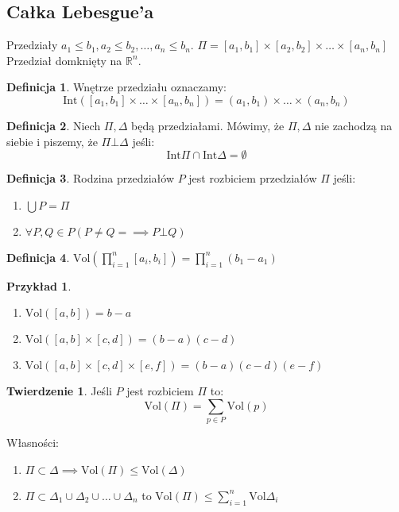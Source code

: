 \documentclass{article}
\theoremstyle{definition}
\newtheorem{de}{Definicja}[subsection]
\theoremstyle{definition}
\newtheorem{tw}{Twierdzenie}[subsection]
\theoremstyle{definition}
\newtheorem{pk}{Przykład}[subsection]
\theoremstyle{definition}
\theoremstyle{definition}
\theoremstyle{definition}
\theoremstyle{definition}
\begin{document}
\subsection{Całka Lebesgue'a}

Przedziały $a_1 \leq b_1, a_2 \leq b_2, \dots, a_n \leq b_n$.
$\Pi = [a_1, b_1] \times [a_2, b_2] \times \dots \times [a_n, b_n]$
Przedział domknięty na $\mathbb{R}^n$. 

\begin{de}
    Wnętrze przedziału oznaczamy:
    \[\text{Int}([a_1,b_1]\times\dots\times[a_n,b_n]) = (a_1,b_1)\times\dots\times(a_n,b_n)\]
\end{de}

\begin{de}
    Niech $\Pi, \Delta$ będą przedziałami. Mówimy, że $\Pi, \Delta$ nie zachodzą na siebie
    i piszemy, że $\Pi \bot \Delta$ jeśli:
        \[\text{Int} \Pi \cap \text{Int} \Delta = \emptyset\]
\end{de}

\begin{de}
    Rodzina przedziałów $P$ jest rozbiciem przedziałów $\Pi$ jeśli:
    \begin{enumerate}
        \item $\bigcup P = \Pi$
        \item $\forall P,Q \in P \left(P\neq Q =\implies P \bot Q \right)$
    \end{enumerate}
\end{de}

\begin{de}
    $\text{Vol}\left(\prod_{i=1}^{n} [a_i,b_i]\right) = \prod_{i=1}^{n} (b_1-a_1)$
\end{de}

\begin{pk}
    \begin{enumerate}
        \item $\text{Vol}([a,b]) = b-a$
        \item $\text{Vol}([a,b]\times[c,d]) = (b-a)(c-d)$
        \item $\text{Vol}([a,b]\times[c,d]\times[e,f]) = (b-a)(c-d)(e-f)$
    \end{enumerate}
\end{pk}

\begin{tw}
    Jeśli $P$ jest rozbiciem $\Pi$ to:
    \[\text{Vol}(\Pi) = \sum_{p\in P} \text{Vol}(p)\]
\end{tw}

Własności:
\begin{enumerate}
    \item $\Pi \subset \Delta \implies \text{Vol}(\Pi) \leq \text{Vol}(\Delta)$
    \item $\Pi \subset \Delta_1 \cup \Delta_2 \cup \dots \cup \Delta_n$
    to $\text{Vol}(\Pi) \leq \sum_{i=1}^{n} \text{Vol}{\Delta_i}$
\end{enumerate}
\end{document}
